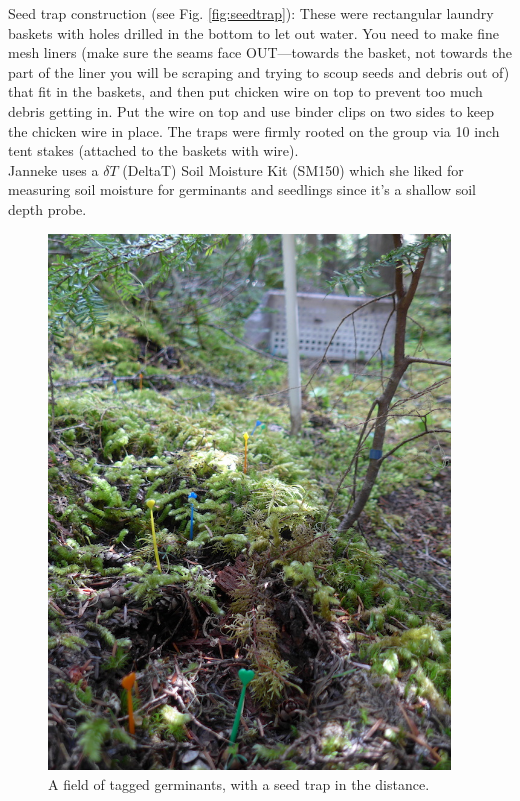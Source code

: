 \documentclass[11pt,letter]{article}
\begin{document}
Seed trap construction (see Fig. \ref{fig:seedtrap}): These were rectangular laundry baskets with holes drilled in the bottom to let out water. You need to make fine mesh liners (make sure the seams face OUT---towards the basket, not towards the part of the liner you will be scraping and trying to scoup seeds and debris out of) that fit in the baskets, and then put chicken wire on top to prevent too much debris getting in. Put the wire on top and use binder clips on two sides to keep the chicken wire in place. The traps were firmly rooted on the group via 10 inch tent stakes (attached to the baskets with wire). \\

Janneke uses a $\delta T$ (DeltaT) Soil Moisture Kit (SM150) which she liked for measuring soil moisture for germinants and seedlings since it's a shallow soil depth probe. 


\begin{figure}[h!]
\centering
\includegraphics[width=0.95\textwidth]{images/2020June18_Rainier237sm.jpg}
\caption{A field of tagged germinants, with a seed trap in the distance.}
\label{fig:tagged} 
\end{figure}
\end{document}
